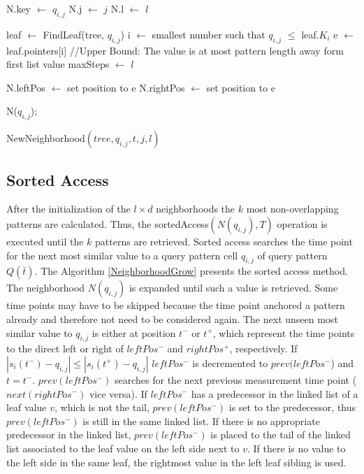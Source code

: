 \documentclass[abstracton,12pt,oneside]{scrreprt}
\begin{document}
\begin{algorithm}[H]
	\IncMargin{1em}
	\SetAlgoLined
	\DontPrintSemicolon
	
	N.key $\leftarrow$ $q_{i,j}$\;
	N.j $\leftarrow$ $j$\;
	N.l $\leftarrow$ $l$\;
	
	\BlankLine
	leaf $\leftarrow$ FindLeaf(tree, $q_{i,j}$)\;
	i $\leftarrow$ smallest number such that $q_{i,j}$ $\leq$ leaf.$K_i$\;
	e $\leftarrow$ leaf.pointers[i]\;
	\BlankLine
	//Upper Bound: The value is at most pattern length away form first list value\;
	maxSteps $\leftarrow$ $l$\;
	
	N.leftPos $\leftarrow$ set position to e\;
	N.rightPos $\leftarrow$ set position to e\;

	\Return N($q_{i,j}$);
	
	
	
	
	\caption{NewNeighborhood$(tree,q_{i,j},t,j,l)$}	\label{initializeNeighborhood}
\end{algorithm}




\subsection{Sorted Access}
After the initialization of the $l \times d$ neighborhoods the $k$ most non-overlapping patterns are calculated. Thus, the sortedAccess$(N(q_{i,j}),T)$ operation is executed until the $k$ patterns are retrieved. 
Sorted access searches the time point for the next most similar value to a query pattern cell $q_{i,j}$ of query pattern $Q(\bar{t})$. The Algorithm \ref{NeighborhoodGrow} presents the sorted access method. The neighborhood $N(q_{i,j})$ is expanded until such a value is retrieved. Some time points may have to be skipped because the time point anchored a pattern already and therefore not need to be considered again. The next unseen most similar value to $q_{i,j}$ is either at position $t^-$ or $t^+$, which represent the time points to the direct left or right of $leftPos^-$ and $rightPos^+$, respectively. If $|s_i(t^-) - q_{i,j}| \leq |s_i(t^+) - q_{i,j}|$ $leftPos^-$ is decremented to $prev(leftPos^-$) and $t=t^-$. $prev(leftPos^-)$ searches for the next previous measurement time point ($next(rightPos^-)$ vice versa). If $leftPos^-$ has a predecessor in the linked list of a leaf value $v$, which is not the tail, $prev(leftPos^-)$ is set to the predecessor, thus $prev(leftPos^-)$ is still in the same linked list. If there is no appropriate predecessor in the linked list, $prev(leftPos^-)$ is placed to the tail of the linked list associated to the leaf value on the left side next to $v$. If there is no value to the left side in the same leaf, the rightmost value in the left leaf sibling is used.
\end{document}
